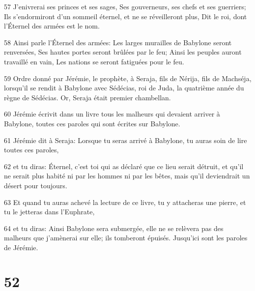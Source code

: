 \par 57 J'enivrerai ses princes et ses sages, Ses gouverneurs, ses chefs et ses guerriers; Ils s'endormiront d'un sommeil éternel, et ne se réveilleront plus, Dit le roi, dont l'Éternel des armées est le nom.
\par 58 Ainsi parle l'Éternel des armées: Les larges murailles de Babylone seront renversées, Ses hautes portes seront brûlées par le feu; Ainsi les peuples auront travaillé en vain, Les nations se seront fatiguées pour le feu.
\par 59 Ordre donné par Jérémie, le prophète, à Seraja, fils de Nérija, fils de Machséja, lorsqu'il se rendit à Babylone avec Sédécias, roi de Juda, la quatrième année du règne de Sédécias. Or, Seraja était premier chambellan.
\par 60 Jérémie écrivit dans un livre tous les malheurs qui devaient arriver à Babylone, toutes ces paroles qui sont écrites sur Babylone.
\par 61 Jérémie dit à Seraja: Lorsque tu seras arrivé à Babylone, tu auras soin de lire toutes ces paroles,
\par 62 et tu diras: Éternel, c'est toi qui as déclaré que ce lieu serait détruit, et qu'il ne serait plus habité ni par les hommes ni par les bêtes, mais qu'il deviendrait un désert pour toujours.
\par 63 Et quand tu auras achevé la lecture de ce livre, tu y attacheras une pierre, et tu le jetteras dans l'Euphrate,
\par 64 et tu diras: Ainsi Babylone sera submergée, elle ne se relèvera pas des malheurs que j'amènerai sur elle; ils tomberont épuisés. Jusqu'ici sont les paroles de Jérémie.

\chapter{52}


